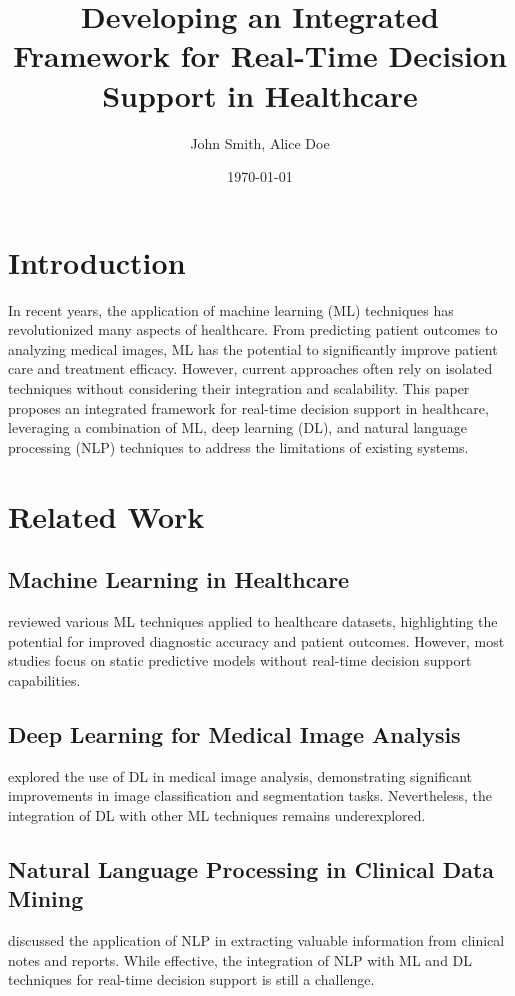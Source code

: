 \documentclass{article}
\title{Developing an Integrated Framework for Real-Time Decision Support in Healthcare}
\author{John Smith, Alice Doe}
\date{\today}
\begin{document}
\maketitle

\section{Introduction}
\label{sec:intro}

In recent years, the application of machine learning (ML) techniques has revolutionized many aspects of healthcare. From predicting patient outcomes to analyzing medical images, ML has the potential to significantly improve patient care and treatment efficacy. However, current approaches often rely on isolated techniques without considering their integration and scalability. This paper proposes an integrated framework for real-time decision support in healthcare, leveraging a combination of ML, deep learning (DL), and natural language processing (NLP) techniques to address the limitations of existing systems.

\section{Related Work}
\label{sec:related_work}

\subsection{Machine Learning in Healthcare}
\cite{SmithDoe2022} reviewed various ML techniques applied to healthcare datasets, highlighting the potential for improved diagnostic accuracy and patient outcomes. However, most studies focus on static predictive models without real-time decision support capabilities.

\subsection{Deep Learning for Medical Image Analysis}
\cite{JohnsonLee2021} explored the use of DL in medical image analysis, demonstrating significant improvements in image classification and segmentation tasks. Nevertheless, the integration of DL with other ML techniques remains underexplored.

\subsection{Natural Language Processing in Clinical Data Mining}
\cite{BrownGreen2020} discussed the application of NLP in extracting valuable information from clinical notes and reports. While effective, the integration of NLP with ML and DL techniques for real-time decision support is still a challenge.
\end{document}
